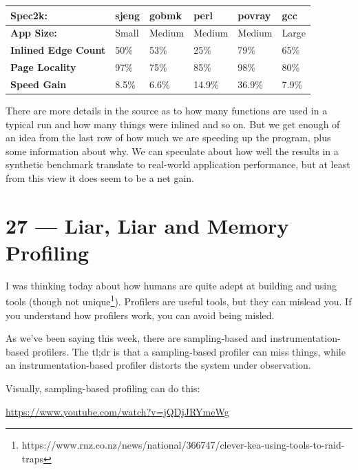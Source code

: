 \documentclass[a4paper]{report}
\begin{document}
\begin{center}
\begin{tabular}{l|l|l|l|l|l}
	\textbf{Spec2k:} & \textbf{sjeng} & \textbf{gobmk} & \textbf{perl} & \textbf{povray} & \textbf{gcc}\\ \hline
	\textbf{App Size:} &  {Small} & {Medium} & {Medium} & {Medium} & {Large} \\ \hline
	\textbf{Inlined Edge Count} & 50\% & 53\% & 25\% & 79\% & 65\% \\ \hline
	\textbf{Page Locality} & 97\% & 75\% & 85\% & 98\% & 80\% \\ \hline
	\textbf{Speed Gain} & 8.5\% & 6.6\% & 14.9\% & 36.9\% & 7.9\% \\ 
\end{tabular}
\end{center}

There are more details in the source as to how many functions are used in a typical run and how many things were inlined and so on. But we get enough of an idea from the last row of how much we are speeding up the program, plus some information about why. We can speculate about how well the results in a synthetic benchmark translate to real-world application performance, but at least from this view it does seem to be a net gain.











\chapter*{27 --- Liar, Liar and Memory Profiling}


I was thinking today about how humans are quite adept at building and
using tools (though not
unique\footnote{https://www.rnz.co.nz/news/national/366747/clever-kea-using-tools-to-raid-traps}). Profilers
are useful tools, but they can mislead you.  If you understand how
profilers work, you can avoid being misled.

As we've been saying this week, there are sampling-based and instrumentation-based profilers.
The tl;dr is that a sampling-based profiler can miss things, while an instrumentation-based
profiler distorts the system under observation.

Visually, sampling-based profiling can do this:
\begin{center}
	\url{https://www.youtube.com/watch?v=jQDjJRYmeWg}
\end{center}
\end{document}
